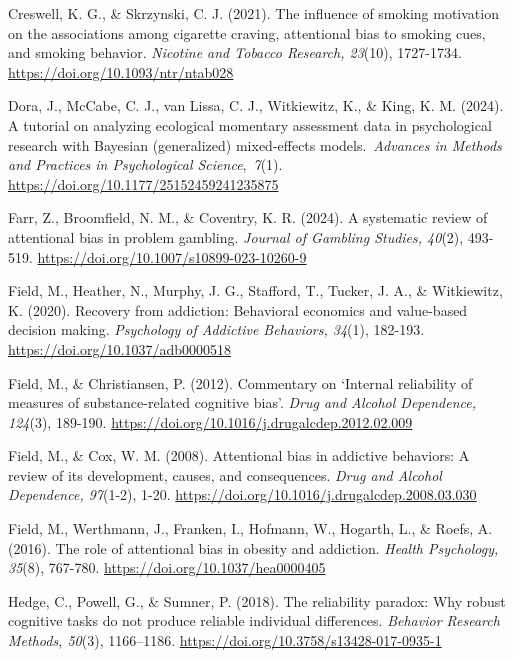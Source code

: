 \documentclass[authordate, reflection, issue]{jote-new-article}
\begin{document}
	Creswell, K. G., \& Skrzynski, C. J. (2021). The influence of smoking motivation on the associations among cigarette craving, attentional bias to smoking cues, and smoking behavior. \emph{Nicotine and Tobacco Research, 23}(10), 1727-1734. \url{https://doi.org/10.1093/ntr/ntab028}



	Dora, J., McCabe, C. J., van Lissa, C. J., Witkiewitz, K., \& King, K. M. (2024). A tutorial on analyzing ecological momentary assessment data in psychological research with Bayesian (generalized) mixed-effects models. \emph{Advances in Methods and Practices in Psychological Science}, \emph{7}(1). \url{https://doi.org/10.1177/25152459241235875}



	Farr, Z., Broomfield, N. M., \& Coventry, K. R. (2024). A systematic review of attentional bias in problem gambling. \emph{Journal of Gambling Studies, 40}(2), 493-519. \url{https://doi.org/10.1007/s10899-023-10260-9}



	Field, M., Heather, N., Murphy, J. G., Stafford, T., Tucker, J. A., \& Witkiewitz, K. (2020). Recovery from addiction: Behavioral economics and value-based decision making. \emph{Psychology of Addictive Behaviors, 34}(1), 182-193. \url{https://doi.org/10.1037/adb0000518}



	Field, M., \& Christiansen, P. (2012). Commentary on ‘Internal reliability of measures of substance-related cognitive bias'. \emph{Drug and Alcohol Dependence, 124}(3), 189-190. \url{https://doi.org/10.1016/j.drugalcdep.2012.02.009}



	Field, M., \& Cox, W. M. (2008). Attentional bias in addictive behaviors: A review of its development, causes, and consequences. \emph{Drug and Alcohol Dependence, 97}(1-2), 1-20. \url{https://doi.org/10.1016/j.drugalcdep.2008.03.030}



	Field, M., Werthmann, J., Franken, I., Hofmann, W., Hogarth, L., \& Roefs, A. (2016). The role of attentional bias in obesity and addiction. \emph{Health Psychology, 35}(8), 767-780. \url{https://doi.org/10.1037/hea0000405}



	Hedge, C., Powell, G., \& Sumner, P. (2018). The reliability paradox: Why robust cognitive tasks do not produce reliable individual differences. \emph{Behavior Research Methods, 50}(3), 1166--1186. \url{https://doi.org/10.3758/s13428-017-0935-1}
\end{document}
